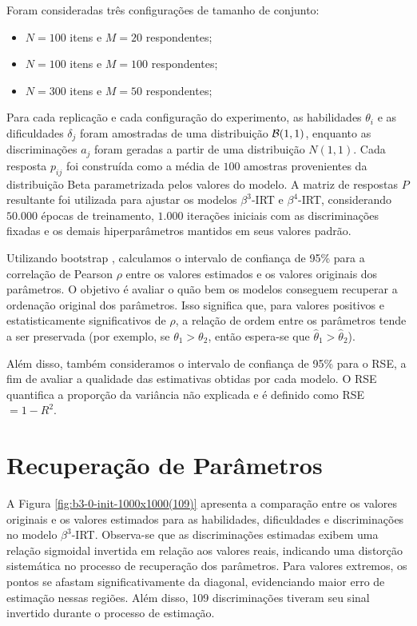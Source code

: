 Foram consideradas três configurações de tamanho de conjunto:

\begin{itemize}
    \item $N = 100$ itens e $M = 20$ respondentes;
    \item $N = 100$ itens e $M = 100$ respondentes;
    \item $N = 300$ itens e $M = 50$ respondentes;
\end{itemize}

Para cada replicação e cada configuração do experimento, as habilidades $\theta_i$ e as dificuldades $\delta_j$ foram amostradas de uma distribuição ${\mathcal{B}}(1,1)$, enquanto as discriminações $a_j$ foram geradas a partir de uma distribuição $N(1,1)$. Cada resposta $p_{ij}$ foi construída como a média de $100$ amostras provenientes da distribuição Beta parametrizada pelos valores do modelo. A matriz de respostas $P$ resultante foi utilizada para ajustar os modelos $\beta^3$-\gls{IRT} e $\beta^4$-\gls{IRT}, considerando $50.000$ épocas de treinamento, $1.000$ iterações iniciais com as discriminações fixadas e os demais hiperparâmetros mantidos em seus valores padrão.

Utilizando bootstrap \cite{hesterberg2011bootstrap}, calculamos o intervalo de confiança de 95\% para a correlação de Pearson $\rho$ entre os valores estimados e os valores originais dos parâmetros. O objetivo é avaliar o quão bem os modelos conseguem recuperar a ordenação original dos parâmetros. Isso significa que, para valores positivos e estatisticamente significativos de $\rho$, a relação de ordem entre os parâmetros tende a ser preservada (por exemplo, se $\theta_1 > \theta_2$, então espera-se que $\hat{\theta}_1 > \hat{\theta}_2$).

Além disso, também consideramos o intervalo de confiança de 95\% para o \gls{RSE}, a fim de avaliar a qualidade das estimativas obtidas por cada modelo. O RSE quantifica a proporção da variância não explicada e é definido como \gls{RSE}$ = 1 - R^2$.

\section{Recuperação de Parâmetros} %

A Figura \ref{fig:b3-0-init-1000x1000(109)} apresenta a comparação entre os valores originais e os valores estimados para as habilidades, dificuldades e discriminações no modelo $\beta^3$-\gls{IRT}. Observa-se que as discriminações estimadas exibem uma relação sigmoidal invertida em relação aos valores reais, indicando uma distorção sistemática no processo de recuperação dos parâmetros. Para valores extremos, os pontos se afastam significativamente da diagonal, evidenciando maior erro de estimação nessas regiões. Além disso, 109 discriminações tiveram seu sinal invertido durante o processo de estimação.

